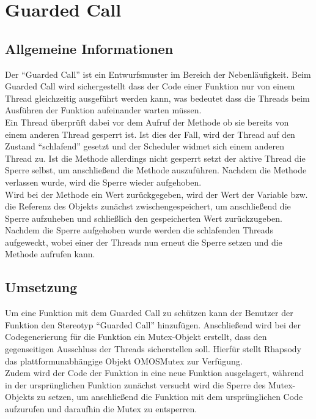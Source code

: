\chapter{Guarded Call}

\section{Allgemeine Informationen}
Der \enquote{Guarded Call} ist ein Entwurfsmuster im Bereich der Nebenläufigkeit. Beim Guarded Call wird sichergestellt dass der Code einer Funktion nur von einem Thread gleichzeitig ausgeführt werden kann, was bedeutet dass die Threads beim Ausführen der Funktion aufeinander warten müssen. \cite[S. 190]{douglass2010design}
\\
Ein Thread überprüft dabei vor dem Aufruf der Methode ob sie bereits von einem anderen Thread gesperrt ist. Ist dies der Fall, wird der Thread auf den Zustand \enquote{schlafend} gesetzt und der Scheduler widmet sich einem anderen Thread zu. Ist die Methode allerdings nicht gesperrt setzt der aktive Thread die Sperre selbst, um anschließend die Methode auszuführen. Nachdem die Methode verlassen wurde, wird die Sperre wieder aufgehoben.
\\
Wird bei der Methode ein Wert zurückgegeben, wird der Wert der Variable bzw. die Referenz des Objekts zunächst zwischengespeichert, um anschließend die Sperre aufzuheben und schließlich den gespeicherten Wert zurückzugeben.
\\
Nachdem die Sperre aufgehoben wurde werden die schlafenden Threads aufgeweckt, wobei einer der Threads nun erneut die Sperre setzen und die Methode aufrufen kann.

\section{Umsetzung}
Um eine Funktion mit dem Guarded Call zu schützen kann der Benutzer der Funktion den Stereotyp \enquote{Guarded Call} hinzufügen. Anschließend wird bei der Codegenerierung für die Funktion ein Mutex-Objekt erstellt, dass den gegenseitigen Ausschluss der Threads sicherstellen soll. Hierfür stellt Rhapsody das plattformunabhängige Objekt OMOSMutex zur Verfügung.
\\
Zudem wird der Code der Funktion in eine neue Funktion ausgelagert, während in der ursprünglichen Funktion zunächst versucht wird die Sperre des Mutex-Objekts zu setzen, um anschließend die Funktion mit dem ursprünglichen Code aufzurufen und daraufhin die Mutex zu entsperren.

